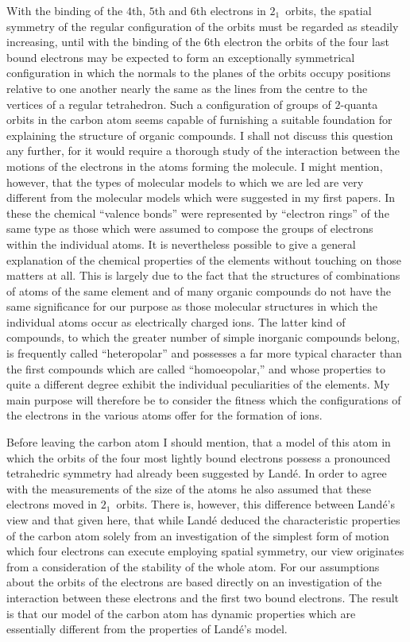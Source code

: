 With the binding of the $4$th, $5$th and $6$th electrons in $2_{1}$~orbits,
the spatial symmetry of the regular configuration of the orbits
must be regarded as steadily increasing, until with the binding of
the $6$th electron the orbits of the four last bound electrons may be
expected to form an exceptionally symmetrical configuration in
which the normals to the planes of the orbits occupy positions
relative to one another nearly the same as the lines from the centre
to the vertices of a regular tetrahedron. Such a configuration
of groups of $2$-quanta orbits in the carbon atom seems capable
of furnishing a suitable foundation for explaining the structure of
organic compounds. I shall not discuss this question any further,
for it would require a thorough study of the interaction between
the motions of the electrons in the atoms forming the molecule.
I might mention, however, that the types of molecular models to
which we are led are very different from the molecular models
which were suggested in my first papers. In these the chemical
``valence bonds'' were represented by ``electron rings'' of the same
type as those which were assumed to compose the groups of
electrons within the individual atoms. It is nevertheless possible
to give a general explanation of the chemical properties of the
elements without touching on those matters at all. This is largely
due to the fact that the structures of combinations of atoms of the
same element and of many organic compounds do not have the
same significance for our purpose as those molecular structures in
which the individual atoms occur as electrically charged ions. The
latter kind of compounds, to which the greater number of simple
inorganic compounds belong, is frequently called ``heteropolar'' and
possesses a far more typical character than the first compounds
which are called ``homoeopolar,'' and whose properties to quite a
different degree exhibit the individual peculiarities of the elements.
My main purpose will therefore be to consider the fitness which
the configurations of the electrons in the various atoms offer for
the formation of ions.

Before leaving the carbon atom I should mention, that a model
of this atom in which the orbits of the four most lightly bound
electrons possess a pronounced tetrahedric symmetry had already
been suggested by Landé. In order to agree with the measurements
of the size of the atoms he also assumed that these electrons moved
in $2_{1}$~orbits. There is, however, this difference between Landé's
view and that given here, that while Landé deduced the characteristic
properties of the carbon atom solely from an investigation of
the simplest form of motion which four electrons can execute
employing spatial symmetry, our view originates from a consideration
of the stability of the whole atom. For our assumptions about
the orbits of the electrons are based directly on an investigation of
the interaction between these electrons and the first two bound
electrons. The result is that our model of the carbon atom has
dynamic properties which are essentially different from the properties
of Landé's model.

